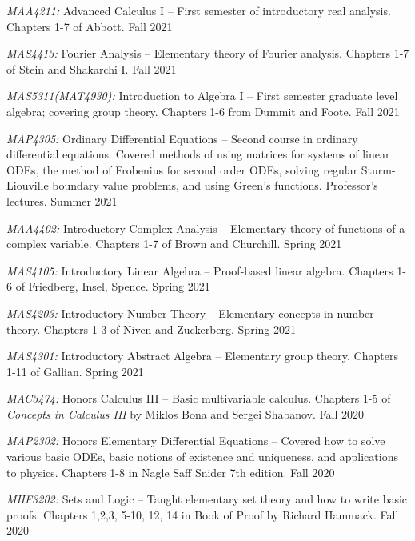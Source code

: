 \documentclass[11pt]{article}
\begin{document}
\textsl{MAA4211:} Advanced Calculus I -- First semester of introductory real analysis. Chapters 1-7 of Abbott. Fall 2021

\textsl{MAS4413:} Fourier Analysis -- Elementary theory of Fourier analysis. Chapters 1-7 of Stein and Shakarchi I. Fall 2021

\textsl{MAS5311(MAT4930)\textsuperscript{\textdagger}:} Introduction to Algebra I -- First semester graduate level algebra; covering group theory. Chapters 1-6 from Dummit and Foote. Fall 2021

\textsl{MAP4305:} Ordinary Differential Equations -- Second course in ordinary differential equations. Covered methods of using matrices for systems of linear ODEs, the method of Frobenius for second order ODEs, solving regular Sturm-Liouville boundary value problems, and using Green's functions. Professor's lectures. Summer 2021

\textsl{MAA4402:} Introductory Complex Analysis -- Elementary theory of functions of a complex variable. Chapters 1-7 of Brown and Churchill. Spring 2021

\textsl{MAS4105:} Introductory Linear Algebra -- Proof-based linear algebra. Chapters 1-6 of Friedberg, Insel, Spence. Spring 2021

\textsl{MAS4203:} Introductory Number Theory -- Elementary concepts in number theory. Chapters 1-3 of Niven and Zuckerberg. Spring 2021

\textsl{MAS4301:} Introductory Abstract Algebra -- Elementary group theory. Chapters 1-11 of Gallian. Spring 2021

\textsl{MAC3474:} Honors Calculus III -- Basic multivariable calculus. Chapters 1-5 of \textsl{Concepts in Calculus III} by Miklos Bona and Sergei Shabanov. Fall 2020

\textsl{MAP2302:} Honors Elementary Differential Equations -- Covered how to solve various basic ODEs, basic notions of existence and uniqueness, and applications to physics. Chapters 1-8 in Nagle Saff Snider 7th edition. Fall 2020

\textsl{MHF3202:} Sets and Logic -- Taught elementary set theory and how to write basic proofs. Chapters 1,2,3, 5-10, 12, 14 in Book of Proof by Richard Hammack. Fall 2020
\end{document}
